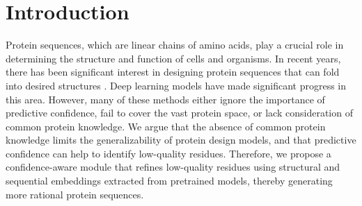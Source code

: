 \documentclass{article}
\begin{document}
\section{Introduction}
\vspace{-3mm}
Protein sequences, which are linear chains of amino acids, play a crucial role in determining the structure and function of cells and organisms. In recent years, there has been significant interest in designing protein sequences that can fold into desired structures \citep{pabo1983molecular}. Deep learning models \citep{li2014direct, wu2021protein, pearce2021deep, ovchinnikov2021structure, ding2022protein, gao2020deep, gao2022alphadesign, dauparas2022robust, ingraham2019generative, jing2020learning, tan2022generative, hsu2022learning, o2018spin2, wang2018computational, qi2020densecpd, strokach2020fast, chen2019improve, zhang2020prodconn, huang2017densely, anand2022protein, strokach2022deep, li20143d, greener2018design, karimi2020novo,anishchenko2021novo, cao2021fold2seq, liu2022rotamer, mcpartlon2022deep, huang2022accurate, dumortier2022petribert, li2022neural, maguire2021xenet, li2022terminator} have made significant progress in this area. However, many of these methods either ignore the importance of predictive confidence, fail to cover the vast protein space, or lack consideration of common protein knowledge. We argue that the absence of common protein knowledge limits the generalizability of protein design models, and that predictive confidence can help to identify low-quality residues. Therefore, we propose a confidence-aware module that refines low-quality residues using structural and sequential embeddings extracted from pretrained models, thereby generating more rational protein sequences.
\end{document}
